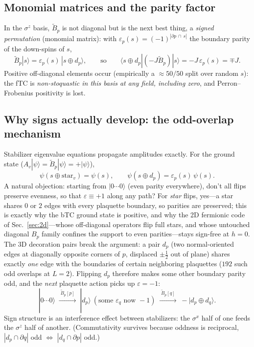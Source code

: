 \documentclass[11pt]{article}
\newcommand{\Av}{A_v}
\newcommand{\Bp}{B_p}
\newcommand{\Bt}{\tilde B_p}
\newcommand{\ket}[1]{|#1\rangle}
\newcommand{\bra}[1]{\langle#1|}
\newcommand{\sx}{\sigma^x}
\newcommand{\sz}{\sigma^z}
\begin{document}
\subsection{Monomial matrices and the parity factor}
In the $\sz$ basis, $\Bt$ is not diagonal but is the next best thing, a
\emph{signed permutation} (monomial matrix): with $\varepsilon_p(s)=
(-1)^{|\partial p\,\cap\,s|}$ the boundary parity of the down-spins of $s$,
\begin{equation}
\Bt\ket{s}=\varepsilon_p(s)\,\ket{s\oplus d_p},
\qquad\text{so}\qquad
\bra{s\oplus d_p}(-J\Bt)\ket{s}=-J\,\varepsilon_p(s)=\mp J .
\label{eq:monomial}
\end{equation}
Positive off-diagonal elements occur (empirically a $\approx50/50$ split over
random $s$): the fTC is \emph{non-stoquastic in this basis at any field,
including zero}, and Perron--Frobenius positivity is lost.

\subsection{Why signs actually develop: the odd-overlap mechanism}
Stabilizer eigenvalue equations propagate amplitudes exactly. For the ground
state ($\Av\ket\psi=\Bt\ket\psi=+\ket\psi$),
\begin{equation}
\psi(s\oplus \mathrm{star}_v)=\psi(s),
\qquad
\psi(s\oplus d_p)=\varepsilon_p(s)\,\psi(s).
\label{eq:rules}
\end{equation}
A natural objection: starting from $\ket{0\cdots0}$ (even parity everywhere),
don't all flips preserve evenness, so that $\varepsilon\equiv+1$ along any
path? For \emph{star} flips, yes---a star shares $0$ or $2$ edges with every
plaquette boundary, so parities are preserved; this is exactly why the bTC
ground state is positive, and why the 2D fermionic code of
Sec.~\ref{sec:2d}---whose off-diagonal operators flip full stars, and whose
untouched diagonal $\Bp$ family confines the support to even parities---stays
sign-free at $h=0$. The 3D decoration pairs break the argument: a pair
$d_p$ (two normal-oriented edges at diagonally opposite corners of $p$,
displaced $\pm\tfrac12$ out of plane) shares exactly \emph{one} edge with the
boundaries of certain neighboring plaquettes ($192$ such odd overlaps at
$L=2$). Flipping $d_p$ therefore makes some other boundary parity odd, and the
\emph{next} plaquette action picks up $\varepsilon=-1$:
\begin{equation}
\ket{0\cdots0}
\;\xrightarrow{\;\Bt[p]\;}\;
\ket{d_p}\ (\text{some } \varepsilon_q \text{ now } -1)
\;\xrightarrow{\;\Bt[q]\;}\;
-\ket{d_p\oplus d_q}.
\end{equation}
Sign structure is an interference effect between stabilizers: the $\sx$ half of
one feeds the $\sz$ half of another. (Commutativity survives because oddness is
reciprocal, $|d_p\cap\partial q|$ odd $\Leftrightarrow$ $|d_q\cap\partial p|$
odd.)
\end{document}
